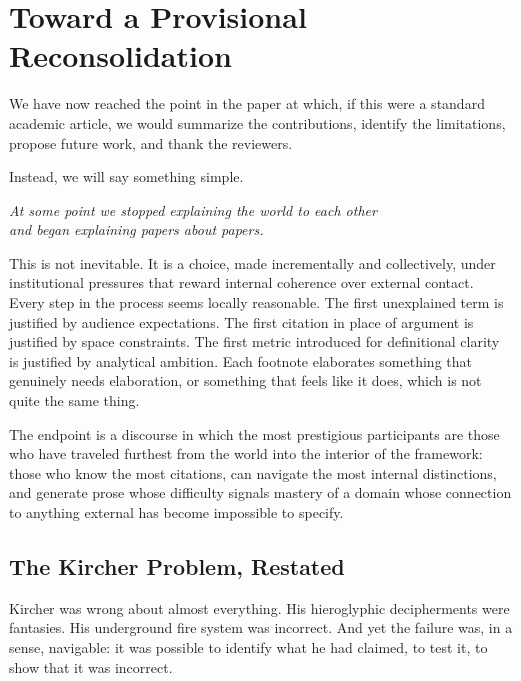 \documentclass[12pt, a4paper]{article}
\begin{document}
\section{Toward a Provisional Reconsolidation}

We have now reached the point in the paper at which, if this were a standard academic article, we would summarize the contributions, identify the limitations, propose future work, and thank the reviewers.

Instead, we will say something simple.

\bigskip

\begin{center}
\textit{At some point we stopped explaining the world to each other\\
and began explaining papers about papers.}
\end{center}

\bigskip

This is not inevitable. It is a choice, made incrementally and collectively, under institutional pressures that reward internal coherence over external contact. Every step in the process seems locally reasonable. The first unexplained term is justified by audience expectations. The first citation in place of argument is justified by space constraints. The first metric introduced for definitional clarity is justified by analytical ambition. Each footnote elaborates something that genuinely needs elaboration, or something that feels like it does, which is not quite the same thing.

The endpoint is a discourse in which the most prestigious participants are those who have traveled furthest from the world into the interior of the framework: those who know the most citations, can navigate the most internal distinctions, and generate prose whose difficulty signals mastery of a domain whose connection to anything external has become impossible to specify.

\subsection{The Kircher Problem, Restated}

Kircher was wrong about almost everything. His hieroglyphic decipherments were fantasies. His underground fire system was incorrect. And yet the failure was, in a sense, navigable: it was possible to identify what he had claimed, to test it, to show that it was incorrect.
\end{document}
